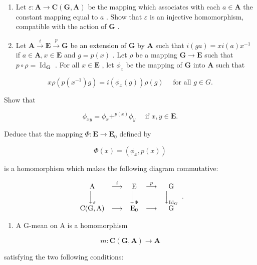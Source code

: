 \begin{enumerate}
\def\labelenumi{(\alph{enumi})}
\item
  Let \(\varepsilon: \mathbf{A} \to \mathbf{C}(\mathbf{G}, \mathbf{A})\) be the mapping which associates with each \(a \in \mathbf{A}\) the constant mapping equal to \(a\) . Show that \(\varepsilon\) is an injective homomorphism, compatible with the action of \(\mathbf{G}\) .
\item
  Let \(\mathbf{A} \xrightarrow{i} \mathbf{E} \xrightarrow{p} \mathbf{G}\) be an extension of \(\mathbf{G}\) by \(\mathbf{A}\) such that \(i(ga) = xi(a)x^{-1}\) if \(a \in \mathbf{A}, x \in \mathbf{E}\) and \(g = p(x)\) . Let \(\rho\) be a mapping \(\mathbf{G} \to \mathbf{E}\) such that \(p \circ \rho = \operatorname{Id}_{\mathbf{G}}\) . For all \(x \in \mathbf{E}\) , let \(\phi_x\) be the mapping of \(\mathbf{G}\) into \(\mathbf{A}\) such that
\end{enumerate}

\[
x \rho (p (x ^ {- 1}) g) = i (\phi_ {x} (g)) \rho (g) \quad \text { for   all } g \in G.
\]

Show that

\[
\phi_ {x y} = \phi_ {x} + ^ {p (x)} \phi_ {y} \quad \text { if } x, y \in \mathbf {E}.
\]

Deduce that the mapping \(\Phi: \mathbf{E} \to \mathbf{E}_0\) defined by

\[
\Phi (x) = (\phi_ {x}, p (x))
\]

is a homomorphism which makes the following diagram commutative:

\[
\begin{array}{c c c c c} \mathrm{A} & \stackrel {{i}} {{\longrightarrow}} & \mathrm{E} & \stackrel {{p}} {{\longrightarrow}} & \mathrm{G} \\ \Big \downarrow_ {\varepsilon} & & \Big \downarrow_ {\Phi} & & \Big \downarrow_ {\mathrm{Id} _ {G}} \\ \mathrm{C(G,A)} & \longrightarrow & \mathrm{E} _ {0} & \longrightarrow & \mathrm{G} \end{array} .
\]

\begin{enumerate}
\def\labelenumi{(\alph{enumi})}
\setcounter{enumi}{2}
\tightlist
\item
  A G-mean on A is a homomorphism
\end{enumerate}

\[
m \colon \mathbf {C} (\mathbf {G}, \mathbf {A}) \rightarrow \mathbf {A}
\]

satisfying the two following conditions:

